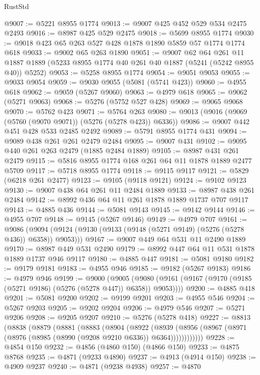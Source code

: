 \begin{lexlean}{RustStd}
\begin{coremodule}
{\begin{coremodule}
{{{{{{{{{{{{{{{{{{{{{{{{{{{{{@9007 := @5221 @8955 @1774
@9013 := @9007 @425 @452 @529 @534 @2475 @2493
@9016 := @8987 @425 @529 @2475
@9018 := @5699 @8955 @1774
@9030 := @9018 @423 @65 @263 @527 @428 @1878 @1890 @5859 @57 @1774 @1774 @618
@9033 := @9002 @65 @263 @1890
@9051 := @9007
    @62
    @64
    @261
    @11
    @1887
    @1889
    (@5233 @8955 @1774 @40 @261 @40 @1887 (@5241 (@5242 @8955 @40)) @5252)
@9053 := @5258 @8955 @1774
@9054 := @9051 @9053
@9055 := @9033 @9054
@9059 := @9030 @9055 (@5081 (@5741 @423))
@9060 := @4955 @618
@9062 := @9059 (@5267 @9060)
@9063 := @4979 @618
@9065 := @9062 (@5271 @9063)
@9068 := @5276 (@5752 @527 @428)
@9069 := @9065 @9068
@9070 := @5762 @423
@9071 := @5764 @263
@9080 := @9013 (@9016 (@9069 (@5760 (@9070 @9071)) (@5276 (@5278 @423)) @6336))
@9086 := @9007 @442 @451 @428 @533 @2485 @2492
@9089 := @5791 @8955 @1774 @431
@9094 := @9089 @438 @261 @261 @2479 @2484
@9095 := @9007 @431
@9102 := @9095 @440 @261 @263 @2479 (@1885 @2484 @1889)
@9105 := @8987 @431 @261 @2479
@9115 := @5816 @8955 @1774 @168 @261 @64 @11 @1878 @1889 @2477 @5709
@9117 := @5718 @8955 @1774
@9118 := @9115 @9117
@9121 := @5829 (@6218 @261 @2477)
@9123 := @9105 (@9118 @9121)
@9124 := @9102 @9123
@9130 := @9007 @438 @64 @261 @11 @2484 @1889
@9133 := @8987 @438 @261 @2484
@9142 := @8992 @436 @64 @11 @261 @1878 @1889 @1737 @707 @9117
@9143 := @4885 @436
@9144 := @5081 @9143
@9145 := @9142 @9144
@9146 := @4955 @707
@9148 := @9145 (@5267 @9146)
@9149 := @4979 @707
@9161 := @9086
    (@9094 (@9124 (@9130 (@9133 (@9148 (@5271 @9149) (@5276 (@5278 @436)) @6358)) @9053)))
@9167 := @9007 @449 @64 @531 @11 @2490 @1889
@9170 := @8987 @449 @531 @2490
@9179 := @8992 @447 @64 @11 @531 @1878 @1889 @1737 @946 @9117
@9180 := @4885 @447
@9181 := @5081 @9180
@9182 := @9179 @9181
@9183 := @4955 @946
@9185 := @9182 (@5267 @9183)
@9186 := @4979 @946
@9199 := @9000
    (@9005 (@9080 (@9161 (@9167 (@9170 (@9185 (@5271 @9186) (@5276 (@5278 @447)) @6358)) @9053))))
@9200 := @4885 @418
@9201 := @5081 @9200
@9202 := @9199 @9201
@9203 := @4955 @546
@9204 := @5267 @9203
@9205 := @9202 @9204
@9206 := @4979 @546
@9207 := @5271 @9206
@9208 := @9205 @9207
@9210 := @5276 (@5278 @418)
@9227 := @8813
    (@8838
      (@8879
        (@8881
          (@8883
            (@8904
              (@8922
                (@8939
                  (@8956 (@8967 (@8971 (@8976 (@8985 (@8990 (@9208 @9210 @6336)) @6364))))))))))))
@9228 := @4854 @150
@9232 := @4856 (@4860 @150) (@4866 @150)
@9233 := @4875 @8768
@9235 := @4871 (@9233 @4890)
@9237 := @4913 (@4914 @150)
@9238 := @4909 @9237
@9240 := @4871 (@9238 @4938)
@9257 := @4870
}}}}}}}}}}}}}}}}}}}}}}}}}}}}}
\end{coremodule}}
\end{coremodule}
\end{lexlean}
